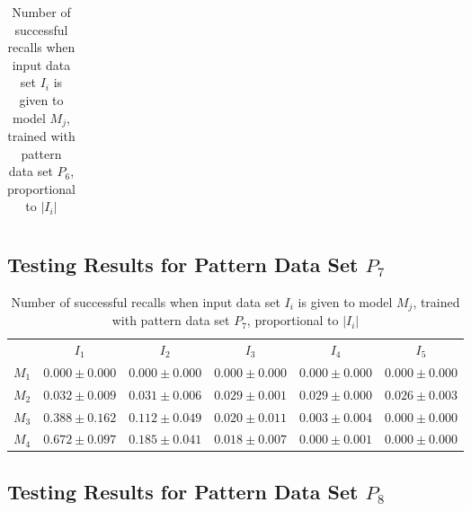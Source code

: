 \documentclass[12pt]{article}
\begin{document}
\begin{appendices}
\begin{table}[H]
\begin{tabular}{cccccc}
    \end{tabular}
    \caption{Number of successful recalls when input data set $I_i$ is given to model $M_j$, trained with pattern data set $P_{6}$, proportional to $\left|I_i\right|$}
    \end{table}
    
\subsection{Testing Results for Pattern Data Set $P_{7}$}


    \begin{table}[H]
    \centering
    \def\arraystretch{1.5}
    \footnotesize
    \begin{tabular}{cccccc}
    
 & $I_{1}$  & $I_{2}$  & $I_{3}$  & $I_{4}$  & $I_{5}$ \\ \cline{2-6}
$M_{1}$  & $0.000\pm0.000$  & $0.000\pm0.000$  & $0.000\pm0.000$  & $0.000\pm0.000$  & $0.000\pm0.000$ \\
$M_{2}$  & $0.032\pm0.009$  & $0.031\pm0.006$  & $0.029\pm0.001$  & $0.029\pm0.000$  & $0.026\pm0.003$ \\
$M_{3}$  & $0.388\pm0.162$  & $0.112\pm0.049$  & $0.020\pm0.011$  & $0.003\pm0.004$  & $0.000\pm0.000$ \\
$M_{4}$  & $0.672\pm0.097$  & $0.185\pm0.041$  & $0.018\pm0.007$  & $0.000\pm0.001$  & $0.000\pm0.000$ \\

    \end{tabular}
    \caption{Number of successful recalls when input data set $I_i$ is given to model $M_j$, trained with pattern data set $P_{7}$, proportional to $\left|I_i\right|$}
    \end{table}
    
\subsection{Testing Results for Pattern Data Set $P_{8}$}


    \begin{table}[H]
    \centering
    \def\arraystretch{1.5}
    \footnotesize
    \begin{tabular}{cccccc}
    

\end{tabular}
\end{table}
\end{appendices}
\end{document}

